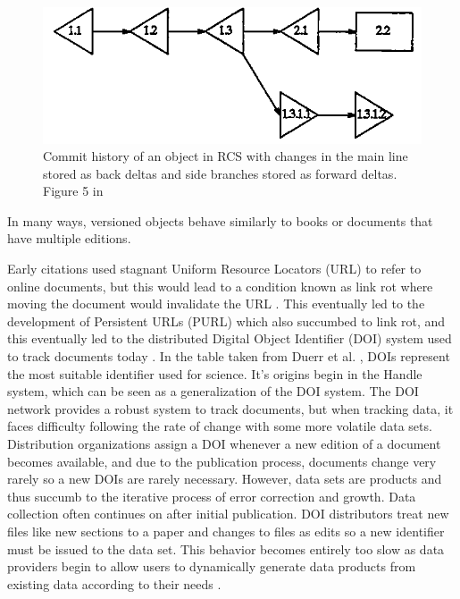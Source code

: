 \begin{figure}
	\centering
	\includegraphics[scale=0.75]{figures/RCSCommitTree.png}
	\caption{Commit history of an object in RCS with changes in the main line stored as back deltas and side branches stored as forward deltas.  Figure 5 in \cite{tichy1985rcs}}
	\label{RCSTree}
\end{figure}



In many ways, versioned objects behave similarly to books or documents that have multiple editions.

Early citations used stagnant Uniform Resource Locators (URL) to refer to online documents, but this would lead to a condition known as link rot where moving the document would invalidate the URL \cite{Lyons2005}.
This eventually led to the development of Persistent URLs (PURL) which also succumbed to link rot, and this eventually led to the distributed Digital Object Identifier (DOI) system used to track documents today \cite{Duerr2011}.
In the table taken from Duerr et al. \cite{Duerr2011}, DOIs represent the most suitable identifier used for science.
It's origins begin in the Handle system, which can be seen as a generalization of the DOI system.
The DOI network provides a robust system to track documents, but when tracking data, it faces difficulty following the rate of change with some more volatile data sets.
Distribution organizations assign a DOI whenever a new edition of a document becomes available, and due to the publication process, documents change very rarely so a new DOIs are rarely necessary.
However, data sets are products and thus succumb to the iterative process of error correction and growth.
Data collection often continues on after initial publication.
DOI distributors treat new files like new sections to a paper and changes to files as edits so a new identifier must be issued to the data set.
This behavior becomes entirely too slow as data providers begin to allow users to dynamically generate data products from existing data according to their needs \cite{Barkstrom2003a}.


